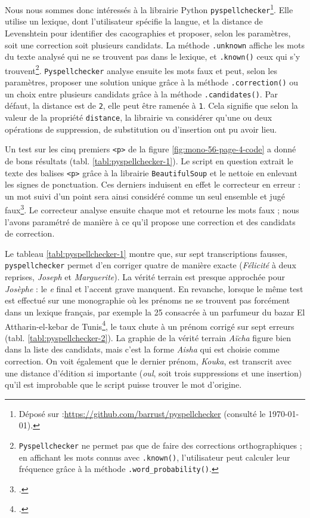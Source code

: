 Nous nous sommes donc intéressés à la librairie Python \texttt{pyspellchecker}\footnote{Déposé sur \github{} :\url{https://github.com/barrust/pyspellchecker} (consulté le \today).}. Elle utilise un lexique, dont l'utilisateur spécifie la langue, et la distance de Levenshtein pour identifier des cacographies et proposer, selon les paramètres, soit une correction soit plusieurs candidats. La méthode \texttt{.unknown{}} affiche les mots du texte analysé qui ne se trouvent pas dans le lexique, et \texttt{.known()} ceux qui s'y trouvent\footnote{\texttt{Pyspellchecker} ne permet pas que de faire des corrections orthographiques ; en affichant les mots connus avec \texttt{.known()}, l'utilisateur peut calculer leur fréquence grâce à la méthode \texttt{.word\_probability()}.}. \texttt{Pyspellchecker} analyse ensuite les mots faux et peut, selon les paramètres, proposer une solution unique grâce à la méthode \texttt{.correction()} ou un choix entre plusieurs candidats grâce à la méthode \texttt{.candidates()}.  Par défaut, la distance est de \texttt{2}, elle peut être ramenée à \texttt{1}. Cela signifie que selon la valeur de la propriété \texttt{distance}, la librairie va considérer qu'une ou deux opérations de suppression, de substitution ou d'insertion ont pu avoir lieu.

Un test sur les cinq premiers \texttt{<p>} de la figure \ref{fig:mono-56-page-4-code} a donné de bons résultats (tabl. \ref{tabl:pyspellchecker-1}). Le script en question extrait le texte des balises \texttt{<p>} grâce à la librairie \texttt{BeautifulSoup} et le nettoie en enlevant les signes de ponctuation. Ces derniers induisent en effet le correcteur en erreur : un mot suivi d'un point sera ainsi considéré comme un seul ensemble et jugé faux\footcite[p. 60]{chiffoleau}. Le correcteur analyse ensuite chaque mot et retourne les mots faux ; nous l'avons paramétré de manière à ce qu'il propose une correction et des candidats de correction.

Le tableau \ref{tabl:pyspellchecker-1} montre que, sur sept transcriptions fausses, \texttt{pyspellchecker} permet d'en corriger quatre de manière exacte (\textit{Félicité} à deux reprises, \textit{Joseph} et \textit{Marguerite}). La vérité terrain est presque approchée pour \textit{Josèphe} : le \textit{e} final et l'accent grave manquent. En revanche, lorsque le même test est effectué sur une monographie où les prénoms ne se trouvent pas forcément dans un lexique français, par exemple la \no{}25 consacrée à un parfumeur du bazar El Attharin-el-kebar de Tunis\footcite{mono025a}, le taux chute à un prénom corrigé sur sept erreurs (tabl. \ref{tabl:pyspellchecker-2}). La graphie de la vérité terrain \textit{Aïcha} figure bien dans la liste des candidats, mais c'est la forme \textit{Aisha} qui est choisie comme correction. On voit également que le dernier prénom, \textit{Kouka}, est transcrit avec une distance d'édition si importante (\textit{oul}, soit trois suppressions et une insertion) qu'il est improbable que le script puisse trouver le mot d'origine.

